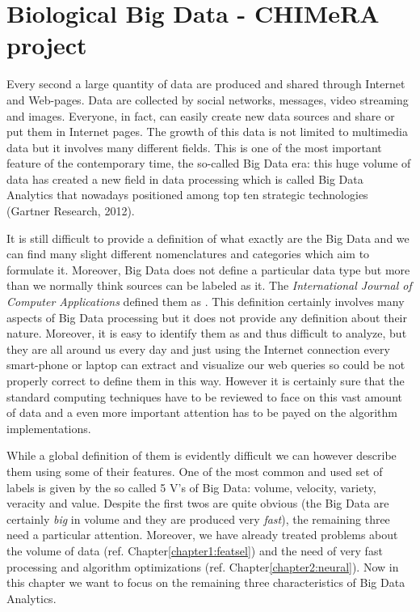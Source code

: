 \documentclass{standalone}
\begin{document}
\chapter[Big Data]{Biological Big Data - CHIMeRA project}\label{chapter3:bigdata}

Every second a large quantity of data are produced and shared through Internet and Web-pages.
Data are collected by social networks, messages, video streaming and images.
Everyone, in fact, can easily create new data sources and share or put them in Internet pages.
The growth of this data is not limited to multimedia data but it involves many different fields.
This is one of the most important feature of the contemporary time, the so-called Big Data era: this huge volume of data has created a new field in data processing which is called Big Data Analytics that nowadays positioned among top ten strategic technologies (Gartner Research, 2012).

It is still difficult to provide a definition of what exactly are the Big Data and we can find many slight different nomenclatures and categories which aim to formulate it.
Moreover, Big Data does not define a particular data type but more than we normally think sources can be labeled as it.
The \emph{International Journal of Computer Applications} defined them as .
This definition certainly involves many aspects of Big Data processing but it does not provide any definition about their nature.
Moreover, it is easy to identify them as  and thus difficult to analyze, but they are all around us every day and just using the Internet connection every smart-phone or laptop can extract and visualize our web queries so could be not properly correct to define them in this way.
However it is certainly sure that the standard computing techniques have to be reviewed to face on this vast amount of data and a even more important attention has to be payed on the algorithm implementations.

While a global definition of them is evidently difficult we can however describe them using some of their  features.
One of the most common and used set of labels is given by the so called 5 V's of Big Data: volume, velocity, variety, veracity and value.
Despite the first twos are quite obvious (the Big Data are certainly \emph{big} in volume and they are produced very \emph{fast}), the remaining three need a particular attention.
Moreover, we have already treated problems about the volume of data (ref. Chapter\ref{chapter1:featsel}) and the need of very fast processing and algorithm optimizations (ref. Chapter\ref{chapter2:neural}).
Now in this chapter we want to focus on the remaining three characteristics of Big Data Analytics.
\end{document}
